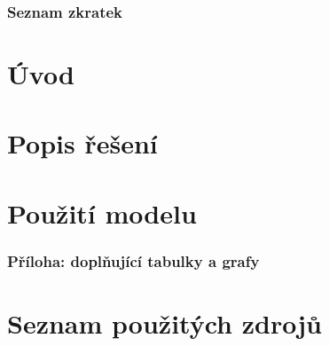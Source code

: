 \documentclass[a4paper, 11pt, twoside]{article}
\begin{document}
  \thispagestyle{empty}
  



  \newpage
  \setcounter{page}{1} %
  \tableofcontents{}


  \newpage
  \section{Seznam zkratek}%
  \begin{multicols}{2}
  
  \end{multicols}

  \listoffigures{}
  \listoftables{}


  \newpage
  \setcounter{page}{1}%
  \part{Úvod}
  
% 
% 
  \newpage
  \part{Popis řešení}\label{cast:1}
  
% 
% 

  \FloatBarrier
  \newpage
  \part{Použití modelu}\label{cast:2}
  


  \FloatBarrier
  \appendix
  \section{Příloha: doplňující tabulky a grafy}\label{sec:priloha}
  

%  


  \FloatBarrier

  \part*{Seznam použitých zdrojů}
  
  
\end{document}
